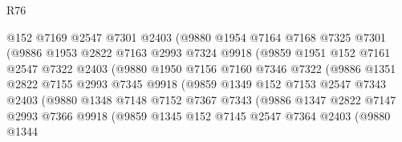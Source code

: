 \begin{lexlean}{R76}
\begin{coremodule}
                        @152
                        @7169
                        @2547
                        @7301
                        @2403
                        (@9880
                          @1954
                          @7164
                          @7168
                          @7325
                          @7301
                          (@9886
                            @1953
                            @2822
                            @7163
                            @2993
                            @7324
                            @9918
                            (@9859
                              @1951
                              @152
                              @7161
                              @2547
                              @7322
                              @2403
                              (@9880
                                @1950
                                @7156
                                @7160
                                @7346
                                @7322
                                (@9886
                                  @1351
                                  @2822
                                  @7155
                                  @2993
                                  @7345
                                  @9918
                                  (@9859
                                    @1349
                                    @152
                                    @7153
                                    @2547
                                    @7343
                                    @2403
                                    (@9880
                                      @1348
                                      @7148
                                      @7152
                                      @7367
                                      @7343
                                      (@9886
                                        @1347
                                        @2822
                                        @7147
                                        @2993
                                        @7366
                                        @9918
                                        (@9859
                                          @1345
                                          @152
                                          @7145
                                          @2547
                                          @7364
                                          @2403
                                          (@9880
                                            @1344

\end{coremodule}
\end{lexlean}
